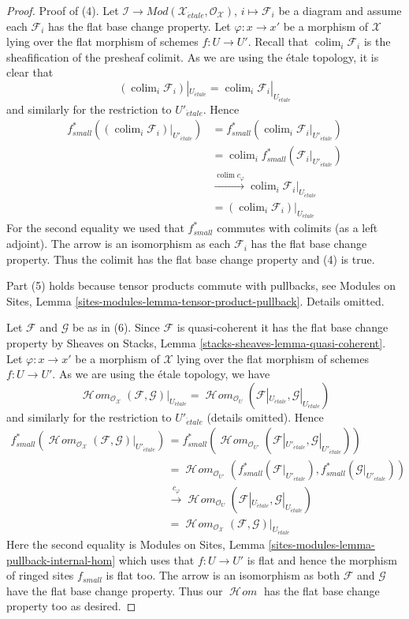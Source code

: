 \documentclass[10pt,a4paper]{amsart}
\theoremstyle{plain}
\theoremstyle{definition}
\theoremstyle{remark}
\numberwithin{equation}{subsection}
\def\colim{\mathop{\mathrm{colim}}\nolimits}
\def\SheafHom{\mathop{\mathcal{H}\!\mathit{om}}\nolimits}
\def\etale{{\acute{e}tale}}
\begin{document}
\begin{proof}
\medskip\noindent
Proof of (4). Let $\mathcal{I} \to
\textit{Mod}(\mathcal{X}_\etale, \mathcal{O}_\mathcal{X})$,
$i \mapsto \mathcal{F}_i$ be a diagram and assume each $\mathcal{F}_i$
has the flat base change property. Let $\varphi : x \to x'$ be a morphism
of $\mathcal{X}$ lying over the flat morphism of schemes $f : U \to U'$.
Recall that $\colim_i \mathcal{F}_i$ is the sheafification of the presheaf
colimit. As we are using the \'etale topology, it is clear that
$$
(\colim_i \mathcal{F}_i)|_{U_\etale} =
\colim_i {\mathcal{F}_i}|_{U_\etale}
$$
and similarly for the restriction to $U'_\etale$. Hence
\begin{align*}
f_{small}^*((\colim_i \mathcal{F}_i)|_{U'_\etale})
& =
f_{small}^*(\colim_i {\mathcal{F}_i}|_{U'_\etale}) \\
& =
\colim_i f_{small}^*({\mathcal{F}_i}|_{U'_\etale}) \\
& \xrightarrow{\colim c_\varphi}
\colim_i \mathcal{F}_i|_{U_\etale} \\
& =
(\colim_i \mathcal{F}_i)|_{U_\etale}
\end{align*}
For the second equality we used that $f_{small}^*$ commutes with colimits
(as a left adjoint). The arrow is an isomorphism as each
$\mathcal{F}_i$ has the flat base change property. Thus the colimit
has the flat base change property and (4) is true.

\medskip\noindent
Part (5) holds because tensor products commute with pullbacks, see
Modules on Sites, Lemma \ref{sites-modules-lemma-tensor-product-pullback}.
Details omitted.

\medskip\noindent
Let $\mathcal{F}$ and $\mathcal{G}$ be as in (6). Since $\mathcal{F}$
is quasi-coherent it has the flat base change property by
Sheaves on Stacks, Lemma \ref{stacks-sheaves-lemma-quasi-coherent}.
Let $\varphi : x \to x'$ be a morphism of $\mathcal{X}$ lying
over the flat morphism of schemes $f : U \to U'$.
As we are using the \'etale topology, we have
$$
\SheafHom_{\mathcal{O}_\mathcal{X}}(\mathcal{F}, \mathcal{G})|_{U_\etale} =
\SheafHom_{\mathcal{O}_U}(\mathcal{F}|_{U_\etale}, \mathcal{G}|_{U_\etale})
$$
and similarly for the restriction to $U'_\etale$ (details omitted). Hence
\begin{align*}
f_{small}^*(
\SheafHom_{\mathcal{O}_\mathcal{X}}(\mathcal{F}, \mathcal{G})|_{U'_\etale})
& =
f_{small}^*(
\SheafHom_{\mathcal{O}_{U'}}(
\mathcal{F}|_{U'_\etale}, \mathcal{G}|_{U'_\etale})) \\
& =
\SheafHom_{\mathcal{O}_{U'}}(
f_{small}^*(\mathcal{F}|_{U'_\etale}),
f_{small}^*(\mathcal{G}|_{U'_\etale})) \\
& \xrightarrow{c_\varphi}
\SheafHom_{\mathcal{O}_U}(\mathcal{F}|_{U_\etale}, \mathcal{G}|_{U_\etale}) \\
& =
\SheafHom_{\mathcal{O}_\mathcal{X}}(\mathcal{F}, \mathcal{G})|_{U_\etale}
\end{align*}
Here the second equality is
Modules on Sites, Lemma \ref{sites-modules-lemma-pullback-internal-hom}
which uses that $f : U \to U'$ is flat and hence the morphism
of ringed sites $f_{small}$ is flat too.
The arrow is an isomorphism as both $\mathcal{F}$ and $\mathcal{G}$
have the flat base change property. Thus our $\SheafHom$
has the flat base change property too as desired.
\end{proof}
\end{document}
